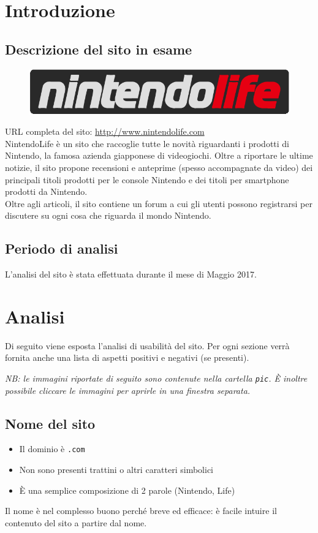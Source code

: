\documentclass[12pt, a4paper,titlepage]{article}
\newcommand{\cmark}{\ding{51}}%
\newcommand{\xmark}{\ding{55}}%
\begin{document}
\section{Introduzione}
\label{sec:introduzione}
\subsection{Descrizione del sito in esame}
\begin{figure}[h]
\centering
\includegraphics[width=.5\textwidth]{Logo_sito}
\end{figure}
URL completa del sito: \url{http://www.nintendolife.com}\\
NintendoLife è un sito che raccoglie tutte le novità riguardanti i prodotti di Nintendo, la famosa azienda giapponese di videogiochi. Oltre a riportare le ultime notizie, il sito propone recensioni e anteprime (spesso accompagnate da video) dei principali titoli prodotti per le console Nintendo e dei titoli per smartphone prodotti da Nintendo.\\
Oltre agli articoli, il sito contiene un forum a cui gli utenti possono registrarsi per discutere su ogni cosa che riguarda il mondo Nintendo.
\subsection{Periodo di analisi}
L'analisi del sito è stata effettuata durante il mese di Maggio 2017.

\section{Analisi} %
\label{sec:analisi}
Di seguito viene esposta l'analisi di usabilità del sito. Per ogni sezione verrà fornita anche una lista di aspetti positivi \cmark e negativi \xmark (se presenti).

\emph{NB: le immagini riportate di seguito sono contenute nella cartella \texttt{pic}. È inoltre possibile cliccare le immagini per aprirle in una finestra separata.}
\subsection{Nome del sito}
\label{sec:nome-sito}
\begin{itemize}
    \item[\cmark] Il dominio è \texttt{.com}
    \item[\cmark] Non sono presenti trattini o altri caratteri simbolici
    \item[\cmark] È una semplice composizione di 2 parole (Nintendo, Life)
\end{itemize}
Il nome è nel complesso buono perché breve ed efficace: è facile intuire il contenuto del sito a partire dal nome.
\clearpage
\end{document}
